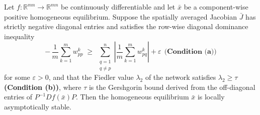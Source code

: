 \documentclass[10pt,a4paper]{amsart}
\begin{document}
\begin{theorem}
\label{thm:main}
Let \(f:\mathbb{R}^{mn} \to \mathbb{R}^{mn}\) be continuously differentiable and let \(\bar{x}\) be a component-wise positive homogeneous equilibrium. Suppose the spatially averaged Jacobian \(\bar{J}\) has strictly negative diagonal entries and satisfies the row-wise diagonal dominance inequality
\begin{equation*}
-\,\frac{1}{m}\sum_{k=1}^{m} w^{k}_{pp}
\;\geq\;
\sum_{\substack{q=1\\q\neq p}}^{n}
\left|\frac{1}{m}\sum_{k=1}^{m} w^{k}_{pq}\right|
+ \varepsilon ~~\textbf{(Condition (a))}
\end{equation*}
for some \(\varepsilon > 0\), and that the Fiedler value \(\lambda_2\) of the network satisfies \(\lambda_2 \ge \tau\) \textbf{(Condition (b))}, where \(\tau\) is the Gershgorin bound derived from the off-diagonal entries of \(P^{-1}Df(\bar{x})P\). Then the homogeneous equilibrium \(\bar{x}\) is locally asymptotically stable.
\end{theorem}
\end{document}

